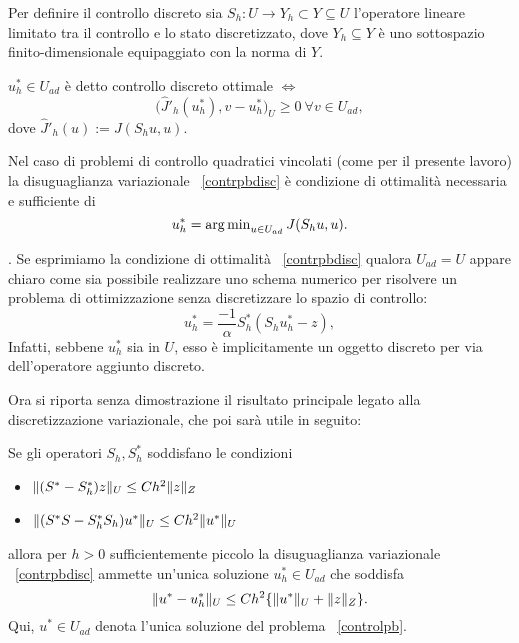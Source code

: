 Per definire il controllo discreto sia $ S_h:U\to Y_h\subset Y\subseteq U$ l'operatore lineare limitato tra il controllo e lo stato discretizzato, dove $ Y_h\subseteq Y $ è uno sottospazio finito-dimensionale equipaggiato con la norma di $ Y $.
\begin{definizione}

$ u^*_h\in U_{ad} $ è detto controllo discreto ottimale $ \iff $
\begin{equation}
\label{contrpbdisc}
\big( \hat{J}'_h(u^*_h),v-u^*_h\big)_U \ge 0 \ \forall v\in U_{ad},
\end{equation}
dove $ \hat{J}'_h(u):=J(S_h u,u) $.
\end{definizione}
\begin{osservazione}

Nel caso di problemi di controllo quadratici vincolati (come per il presente lavoro) la disuguaglianza variazionale ~\eqref{contrpbdisc} è condizione di ottimalità necessaria e sufficiente di 
\begin{equation}
u^{*}_{h}= \operatorname{arg\,min}_{u \in U_{ad}} J(S_hu,u).
\end{equation}

\end{osservazione}.
Se esprimiamo la condizione di ottimalità ~\eqref{contrpbdisc} qualora $ U_{ad}=U $ appare chiaro come sia possibile realizzare uno schema numerico per risolvere un problema di ottimizzazione senza discretizzare lo spazio di controllo:
\begin{equation}
u^*_h=\frac{-1}{\alpha}S^*_h(S_hu^*_h-z),
\end{equation}
Infatti, sebbene $ u^*_h $ sia in $ U $, esso è implicitamente un oggetto discreto per via dell'operatore aggiunto discreto.

Ora si riporta senza dimostrazione il risultato principale legato alla discretizzazione variazionale, che poi sarà utile in seguito: 
\begin{teorema}
\label{teo:Hin}

Se gli operatori $ S_h, S^*_h $ soddisfano le condizioni
\begin{itemize}

\item $ \lVert(S^*-S^*_h)z\rVert_U\le Ch^2\lVert z\rVert_Z $
\item $ \lVert(S^*S-S^*_hS_h)u^*\rVert_U\le Ch^2\lVert u^*\rVert_U $

\end{itemize}
allora per $ h>0 $ sufficientemente piccolo la disuguaglianza variazionale ~\eqref{contrpbdisc} ammette un'unica soluzione $ u^*_h\in U_{ad} $ che soddisfa 
\begin{equation}
\lVert u^*-u^*_h\rVert_U\le Ch^2\{ \lVert u^*\rVert_U + \lVert z\rVert_Z\}.
\end{equation}
Qui, $ u^*\in U_{ad} $ denota l'unica soluzione del problema ~\eqref{controlpb}.

\end{teorema}

